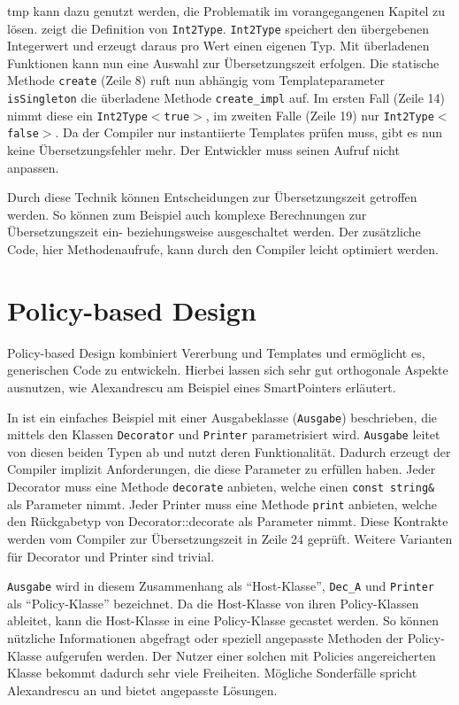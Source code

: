 \ac{tmp} kann dazu genutzt werden, die Problematik im vorangegangenen Kapitel zu lösen.  zeigt die Definition von \texttt{Int2Type}. \texttt{Int2Type} speichert den übergebenen Integerwert und erzeugt daraus pro Wert einen eigenen Typ. Mit überladenen Funktionen kann nun eine Auswahl zur Übersetzungszeit erfolgen. Die statische Methode \texttt{create} (Zeile 8) ruft nun abhängig vom Templateparameter \texttt{isSingleton} die überladene Methode \texttt{create\_impl} auf. Im ersten Fall (Zeile 14) nimmt diese ein \texttt{Int2Type$<$true$>$}, im zweiten Falle (Zeile 19) nur \texttt{Int2Type$<$false$>$}. Da der Compiler nur instantiierte Templates prüfen muss, gibt es nun keine Übersetzungsfehler mehr. Der Entwickler muss seinen Aufruf nicht anpassen.



Durch diese Technik können Entscheidungen zur Übersetzungszeit getroffen werden. So können zum Beispiel auch komplexe Berechnungen zur Übersetzungszeit ein- beziehungsweise ausgeschaltet werden. Der zusätzliche Code, hier Methodenaufrufe, kann durch den Compiler leicht optimiert werden.

\section{Policy-based Design}
Policy-based Design kombiniert Vererbung und Templates und ermöglicht es, generischen Code zu entwickeln. Hierbei lassen sich sehr gut orthogonale Aspekte ausnutzen, wie Alexandrescu am Beispiel eines SmartPointers erläutert.

In  ist ein einfaches Beispiel mit einer Ausgabeklasse (\texttt{Ausgabe}) beschrieben, die mittels den Klassen \texttt{Decorator} und \texttt{Printer} parametrisiert wird. \texttt{Ausgabe} leitet von diesen beiden Typen ab und nutzt deren Funktionalität. Dadurch erzeugt der Compiler implizit Anforderungen, die diese Parameter zu erfüllen haben. Jeder Decorator muss eine Methode \texttt{decorate} anbieten, welche einen \texttt{const string\&} als Parameter nimmt. Jeder Printer muss eine Methode \texttt{print} anbieten, welche den Rückgabetyp von Decorator::decorate als Parameter nimmt. Diese Kontrakte werden vom Compiler zur Übersetzungszeit in Zeile 24 geprüft. Weitere Varianten für Decorator und Printer sind trivial.

\texttt{Ausgabe} wird in diesem Zusammenhang als \enquote{Host-Klasse}, \texttt{Dec\_A} und \texttt{Printer} als \enquote{Policy-Klasse} bezeichnet. Da die Host-Klasse von ihren Policy-Klassen ableitet, kann die Host-Klasse in eine Policy-Klasse gecastet werden. So können nützliche Informationen abgefragt oder speziell angepasste Methoden der Policy-Klasse aufgerufen werden. Der Nutzer einer solchen mit Policies angereicherten Klasse bekommt dadurch sehr viele Freiheiten. Mögliche Sonderfälle spricht Alexandrescu an und bietet angepasste Lösungen.

